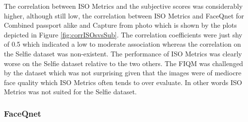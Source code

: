 \noindent
The correlation between ISO Metrics and the subjective scores was considerably higher, although still low, the correlation between ISO Metrics and FaceQnet for Combined passport alike and Capture from photo which is shown by the plots depicted in Figure \ref{fig:corrISOsvsSub}. The correlation coefficients were just shy of 0.5 which indicated a low to moderate association whereas the correlation on the Selfie dataset was non-existent. The performance of ISO Metrics was clearly worse on the Selfie dataset relative to the two others. The FIQM was challenged by the dataset which was not surprising given that the images were of mediocre face quality which ISO Metrics often tends to over evaluate. In other words ISO Metrics was not suited for the Selfie dataset.  

\subsubsection{FaceQnet}
